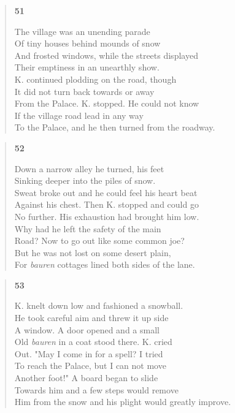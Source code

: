 \documentclass{article}
\begin{document}
\begin{verse}
  \begin{center}
    \textbf{51} \\
  \end{center}
  The village was an unending parade \\
  Of tiny houses behind mounds of snow \\
  And frosted windows, while the streets displayed \\
  Their emptiness in an unearthly show. \\
  K. continued plodding on the road, though \\
  It did not turn back towards or away \\
  From the Palace. K. stopped. He could not know \\
  If the village road lead in any way \\
  To the Palace, and he then turned from the roadway.
\end{verse}
\newpage
\begin{verse}
  \begin{center}
    \textbf{52} \\
  \end{center}
  Down a narrow alley he turned, his feet \\
  Sinking deeper into the piles of snow. \\
  Sweat broke out and he could feel his heart beat \\
  Against his chest. Then K. stopped and could go \\
  No further. His exhaustion had brought him low. \\
  Why had he left the safety of the main \\
  Road? Now to go out like some common joe? \\
  But he was not lost on some desert plain, \\
  For \textit{bauren} cottages lined both sides of the lane.
\end{verse}
\begin{verse}
  \begin{center}
    \textbf{53} \\
  \end{center}
  K. knelt down low and fashioned a snowball. \\
  He took careful aim and threw it up side \\
  A window. A door opened and a small \\
  Old \textit{bauren} in a coat stood there.  K. cried \\
  Out. "May I come in for a spell? I tried \\
  To reach the Palace, but I can not move \\
  Another foot!" A board began to slide \\
  Towards him and a few steps would remove \\
  Him from the snow and his plight would greatly improve.
\end{verse}
\end{document}
